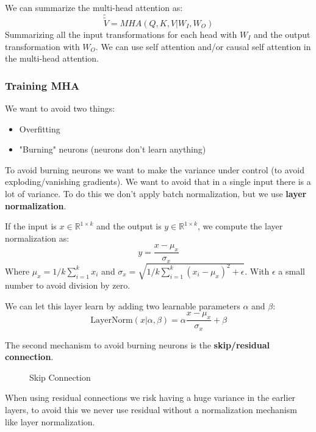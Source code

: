 We can summarize the multi-head attention as:
\[
    \tilde{\tilde{V}}=MHA(Q,K,V|W_I,W_O)
\]
Summarizing all the input transformations for each head with $W_I$ and the output transformation with $W_O$.
We can use self attention and/or causal self attention in the multi-head attention.

\subsubsection{Training MHA}

We want to avoid two things:
\begin{itemize}
    \item Overfitting
    \item "Burning" neurons (neurons don't learn anything)
\end{itemize}

To avoid burning neurons we want to make the variance under control (to avoid exploding/vanishing gradients).
We want to avoid that in a single input there is a lot of variance.
To do this we don't apply batch normalization, but we use \textbf{layer normalization}.

If the input is $x\in\mathbb{R}^{1\times k}$ and the output is $y\in\mathbb{R}^{1\times k}$, we compute the layer normalization as:
\[
    y=\frac{x-\mu_x}{\sigma_x}
\]
Where $\mu_x=1/k\sum_{i=1}^{k}x_i$ and $\sigma_x=\sqrt{1/k\sum_{i=1}^{k}(x_i-\mu_x)^2 + \epsilon}$.
With $\epsilon$ a small number to avoid division by zero.

We can let this layer learn by adding two learnable parameters $\alpha$ and $\beta$:
\[
    \text{LayerNorm}(x|\alpha,\beta)=\alpha\frac{x-\mu_x}{\sigma_x}+\beta
\]

The second mechanism to avoid burning neurons is the \textbf{skip/residual connection}.

\begin{figure}[H]
    \centering
    \caption{Skip Connection}
    \label{fig:skip-connection}
\end{figure}

When using residual connections we risk having a huge variance in the earlier layers, to avoid this
we never use residual without a normalization mechanism like layer normalization.
